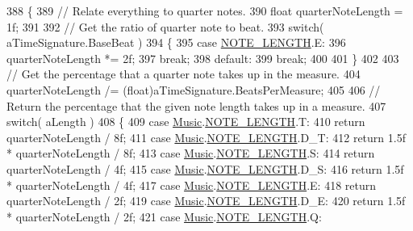 \begin{DoxyCode}
388     \{
389         \textcolor{comment}{// Relate everything to quarter notes.}
390         \textcolor{keywordtype}{float} quarterNoteLength = 1f;
391 
392         \textcolor{comment}{// Get the ratio of quarter note to beat.}
393         \textcolor{keywordflow}{switch}( aTimeSignature.BaseBeat )
394         \{
395             \textcolor{keywordflow}{case} \hyperlink{group___music_enums_gaf11b5f079adbb21c800b9eca1c5c3cbd}{NOTE\_LENGTH}.E:
396                 quarterNoteLength *= 2f;
397                 \textcolor{keywordflow}{break};
398             \textcolor{keywordflow}{default}:
399                 \textcolor{keywordflow}{break};
400 
401         \}
402 
403         \textcolor{comment}{// Get the percentage that a quarter note takes up in the measure.}
404         quarterNoteLength /= (float)aTimeSignature.BeatsPerMeasure;
405 
406         \textcolor{comment}{// Return the percentage that the given note length takes up in a measure.}
407         \textcolor{keywordflow}{switch}( aLength )
408         \{
409             \textcolor{keywordflow}{case} \hyperlink{class_music}{Music}.\hyperlink{group___music_enums_gaf11b5f079adbb21c800b9eca1c5c3cbd}{NOTE\_LENGTH}.T:
410                 \textcolor{keywordflow}{return} quarterNoteLength / 8f;
411             \textcolor{keywordflow}{case} \hyperlink{class_music}{Music}.\hyperlink{group___music_enums_gaf11b5f079adbb21c800b9eca1c5c3cbd}{NOTE\_LENGTH}.D\_T:
412                 \textcolor{keywordflow}{return} 1.5f * quarterNoteLength / 8f;
413             \textcolor{keywordflow}{case} \hyperlink{class_music}{Music}.\hyperlink{group___music_enums_gaf11b5f079adbb21c800b9eca1c5c3cbd}{NOTE\_LENGTH}.S:
414                 \textcolor{keywordflow}{return} quarterNoteLength / 4f;
415             \textcolor{keywordflow}{case} \hyperlink{class_music}{Music}.\hyperlink{group___music_enums_gaf11b5f079adbb21c800b9eca1c5c3cbd}{NOTE\_LENGTH}.D\_S:
416                 \textcolor{keywordflow}{return} 1.5f * quarterNoteLength / 4f;
417             \textcolor{keywordflow}{case} \hyperlink{class_music}{Music}.\hyperlink{group___music_enums_gaf11b5f079adbb21c800b9eca1c5c3cbd}{NOTE\_LENGTH}.E:
418                 \textcolor{keywordflow}{return} quarterNoteLength / 2f;
419             \textcolor{keywordflow}{case} \hyperlink{class_music}{Music}.\hyperlink{group___music_enums_gaf11b5f079adbb21c800b9eca1c5c3cbd}{NOTE\_LENGTH}.D\_E:
420                 \textcolor{keywordflow}{return} 1.5f * quarterNoteLength / 2f;
421             \textcolor{keywordflow}{case} \hyperlink{class_music}{Music}.\hyperlink{group___music_enums_gaf11b5f079adbb21c800b9eca1c5c3cbd}{NOTE\_LENGTH}.Q:

\end{DoxyCode}

